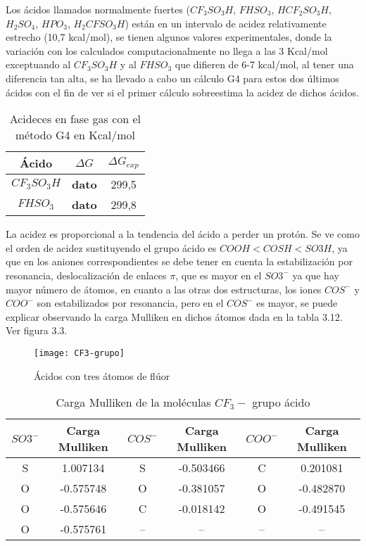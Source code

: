 Los ácidos llamados normalmente fuertes ($ CF_3SO_3H$, $FHSO_3$, $HCF_2SO_3H$, $H_2SO_4$, $HPO_3$, $H_2CFSO_3H$) están en un intervalo de acidez relativamente estrecho (10,7 kcal/mol), se tienen algunos valores experimentales, donde la variación con los calculados computacionalmente no llega a las 3 Kcal/mol exceptuando al $CF_3SO_3H$ y al $FHSO_3$ que difieren de 6-7 kcal/mol, al tener una diferencia tan alta, se ha llevado a cabo un cálculo G4 para estos dos últimos ácidos con el fin de ver si el primer cálculo sobreestima la acidez de dichos ácidos. 
\begin{table}[H]
	\centering
	\begin{tabular}{|c|c|c|}
		\hline
		Ácido & $\Delta G$ & $\Delta G_{exp}$ \\ \hline
		$CF_3SO_3H$ &{\bfseries dato }& 299,5 \\ \hline
		$FHSO_3$ & {\bfseries dato } & 299,8 \\ \hline 
	\end{tabular}
\caption{Acideces en fase gas con el método G4 en Kcal/mol}
\end{table}

La acidez es proporcional a la tendencia del ácido a perder un protón. Se ve como el orden de acidez sustituyendo el grupo ácido es $ COOH {<} COSH {<} SO3H $, ya que en los aniones correspondientes se debe tener en cuenta la estabilización por resonancia, deslocalización de enlaces $\pi$, que es mayor en el $SO3^-$ ya que hay mayor número de átomos, en cuanto a las otras dos estructuras, los iones $COS^-$ y $COO^-$ son estabilizados por resonancia, pero en el $COS^-$ es mayor, se puede explicar observando la carga Mulliken en dichos átomos dada en la tabla 3.12. Ver figura 3.3.

\begin{figure}[H]
	\centering
	\texttt{[image: CF3-grupo]}
	\caption{Ácidos con tres átomos de flúor}
\end{figure}

\begin{table}[H]
    \centering
    \begin{tabular}{|c|c|c|c|c|c|}
    \hline
    $SO3^-$ & Carga Mulliken &$COS^-$ & Carga Mulliken & $COO^-$ & Carga Mulliken \\ \hline
    S & 1.007134 & S & -0.503466 & C & 0.201081 \\ \hline
    O & -0.575748 & O & -0.381057 & O & -0.482870 \\ \hline
    O & -0.575646 & C & -0.018142 & O & -0.491545 \\ \hline
    O & -0.575761 & -- & -- & -- & -- \\ \hline
    \end{tabular}
    \caption{Carga Mulliken de la moléculas $CF_3-$ grupo ácido}
\end{table}

